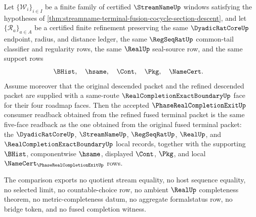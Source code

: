 \begin{theorem}
\label{thm:streamname-terminal-fusion-phase-exit-refinement-readback-invariance}
Let $\{\mathcal W_i\}_{i\in I}$ be a finite family of certified
$\StreamNameUp$ windows satisfying the hypotheses of
\autoref{thm:streamname-terminal-fusion-cocycle-section-descent}, and let
$\{\mathcal R_a\}_{a\in A}$ be a certified finite refinement preserving the
same $\DyadicRatCoreUp$ endpoint, radius, and distance ledger, the same
$\RegSeqRatUp$ common-tail classifier and regularity rows, the same $\RealUp$
seal-source row, and the same support rows
$$
\BHist,\quad \hsame,\quad \Cont,\quad \Pkg,\quad \NameCert.
$$
Assume moreover that the original descended packet and the refined descended
packet are supplied with a same-route $\RealCompletionExactBoundaryUp$ face for
their four roadmap faces. Then the accepted $\PhaseRealCompletionExitUp$
consumer readback obtained from the refined fused terminal packet is the same
five-face readback as the one obtained from the original fused terminal packet:
the $\DyadicRatCoreUp$, $\StreamNameUp$, $\RegSeqRatUp$, $\RealUp$, and
$\RealCompletionExactBoundaryUp$ local records, together with the supporting
$\BHist$, componentwise $\hsame$, displayed $\Cont$, $\Pkg$, and local
$\NameCert_{\PhaseRealCompletionExitUp}$ rows.

The comparison exports no quotient stream equality, no host sequence equality,
no selected limit, no countable-choice row, no ambient $\RealUp$ completeness
theorem, no metric-completeness datum, no aggregate formalstatus row, no
bridge token, and no fused completion witness.
\end{theorem}
